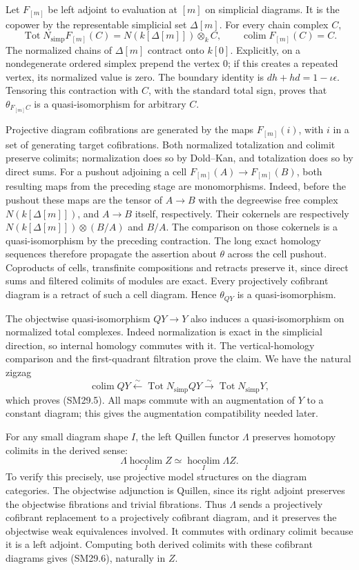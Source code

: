 \documentclass[11pt,a4paper]{article}
\theoremstyle{definition}\newtheorem{definition}[theorem]{Definition}
\theoremstyle{remark}\newtheorem{remark}[theorem]{Remark}
\begin{document}
Let \(F_{[m]}\) be left adjoint to evaluation at \([m]\) on
simplicial diagrams.  It is the copower by the representable
simplicial set \(\Delta[m]\).  For every chain complex \(C\),
\[
 \operatorname{Tot}N_{\mathrm{simp}}F_{[m]}(C)
       =N(k[\Delta[m]])\otimes_k C,\qquad
 \operatorname{colim}F_{[m]}(C)=C.
\]
The normalized chains of \(\Delta[m]\) contract onto \(k[0]\).
Explicitly, on a nondegenerate ordered simplex prepend the
vertex \(0\); if this creates a repeated vertex, its normalized
value is zero.  The boundary identity is
\(dh+hd=1-\iota\epsilon\).
Tensoring this contraction with \(C\), with the standard total
sign, proves that \(\theta_{F_{[m]}C}\) is a quasi-isomorphism
for arbitrary \(C\).

Projective diagram cofibrations are generated by the maps
\(F_{[m]}(i)\), with \(i\) in a set of generating target
cofibrations.  Both normalized totalization and colimit
preserve colimits; normalization does so by Dold--Kan,
and totalization does so by direct sums.
For a pushout adjoining a cell \(F_{[m]}(A)\to F_{[m]}(B)\),
both resulting maps from the preceding stage are monomorphisms.
Indeed, before the pushout these maps are the tensor of \(A\to B\)
with the degreewise free complex \(N(k[\Delta[m]])\), and
\(A\to B\) itself, respectively.
Their cokernels are respectively
\(N(k[\Delta[m]])\otimes(B/A)\) and \(B/A\).
The comparison on those cokernels is a quasi-isomorphism by
the preceding contraction.  The long exact homology sequences
therefore propagate the assertion about \(\theta\) across the
cell pushout.  Coproducts of cells, transfinite compositions
and retracts preserve it, since direct sums and filtered
colimits of modules are exact.  Every projectively cofibrant
diagram is a retract of such a cell diagram.  Hence
\(\theta_{QY}\) is a quasi-isomorphism.

The objectwise quasi-isomorphism \(QY\to Y\) also induces a
quasi-isomorphism on normalized total complexes.
Indeed normalization is exact in the simplicial direction,
so internal homology commutes with it.  The vertical-homology
comparison and the first-quadrant filtration prove the claim.
We have the natural zigzag
\[
 \operatorname{colim}QY
 \xleftarrow{\ \sim\ }\operatorname{Tot}N_{\mathrm{simp}}QY
 \xrightarrow{\ \sim\ }\operatorname{Tot}N_{\mathrm{simp}}Y,
\]
which proves (SM29.5).  All maps commute with an augmentation
of \(Y\) to a constant diagram; this gives the augmentation
compatibility needed later.

For any small diagram shape \(I\), the left Quillen functor
\(\Lambda\) preserves homotopy colimits in the derived sense:
\[
 \Lambda\operatorname*{hocolim}_I Z
       \simeq\operatorname*{hocolim}_I\Lambda Z.
 \tag{SM29.6}
\]
To verify this precisely, use projective model structures on
the diagram categories.  The objectwise adjunction is
Quillen, since its right adjoint preserves the objectwise
fibrations and trivial fibrations.  Thus \(\Lambda\) sends a
projectively cofibrant replacement to a projectively
cofibrant diagram, and it preserves the objectwise weak
equivalences involved.  It commutes with ordinary colimit
because it is a left adjoint.  Computing both derived
colimits with these cofibrant diagrams gives (SM29.6),
naturally in \(Z\).
\end{document}
